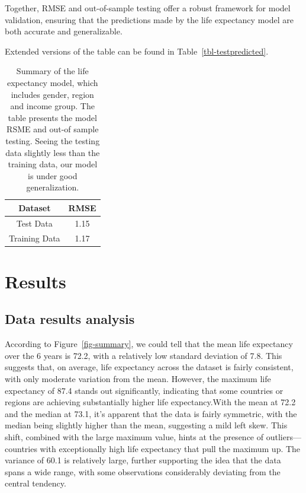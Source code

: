 \documentclass[
  letterpaper,
  DIV=11,
  numbers=noendperiod]{scrartcl}
\begin{document}
Together, RMSE and out-of-sample testing offer a robust framework for
model validation, ensuring that the predictions made by the life
expectancy model are both accurate and generalizable.

Extended versions of the table can be found in
Table~\ref{tbl-testpredicted}.

\begingroup\fontsize{14}{16}\selectfont

\begin{longtable}[t]{cc}

\caption{\label{tbl-modelpredict}Summary of the life expectancy model,
which includes gender, region and income group. The table presents the
model RSME and out-of sample testing. Seeing the testing data slightly
less than the training data, our model is under good generalization.}

\tabularnewline

\toprule
Dataset & RMSE\\
\midrule
Test Data & 1.15\\
Training Data & 1.17\\
\bottomrule

\end{longtable}

\endgroup{}

\section{Results}\label{sec-result}

\subsection{Data results analysis}\label{data-results-analysis}

According to Figure~\ref{fig-summary}, we could tell that the mean life
expectancy over the 6 years is 72.2, with a relatively low standard
deviation of 7.8. This suggests that, on average, life expectancy across
the dataset is fairly consistent, with only moderate variation from the
mean. However, the maximum life expectancy of 87.4 stands out
significantly, indicating that some countries or regions are achieving
substantially higher life expectancy.With the mean at 72.2 and the
median at 73.1, it's apparent that the data is fairly symmetric, with
the median being slightly higher than the mean, suggesting a mild left
skew. This shift, combined with the large maximum value, hints at the
presence of outliers---countries with exceptionally high life expectancy
that pull the maximum up. The variance of 60.1 is relatively large,
further supporting the idea that the data spans a wide range, with some
observations considerably deviating from the central tendency.
\end{document}
